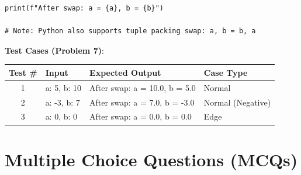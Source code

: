 \begin{solutionbox}
\begin{lstlisting}[language=Python3]
print(f"After swap: a = {a}, b = {b}")

# Note: Python also supports tuple packing swap: a, b = b, a
\end{lstlisting}
\vspace{4pt}
\noindent\textbf{Test Cases (Problem 7)}:

\noindent\begin{tabular}{|c|p{4cm}|p{4.5cm}|p{2.2cm}|}
\hline
\textbf{Test \#} & \textbf{Input} & \textbf{Expected Output} & \textbf{Case Type} \\
\hline
1 & a: 5, b: 10 & After swap: a = 10.0, b = 5.0 & Normal \\
2 & a: -3, b: 7 & After swap: a = 7.0, b = -3.0 & Normal (Negative) \\
3 & a: 0, b: 0 & After swap: a = 0.0, b = 0.0 & Edge \\
\hline
\end{tabular}

\end{solutionbox}

\section{Multiple Choice Questions (MCQs)}

